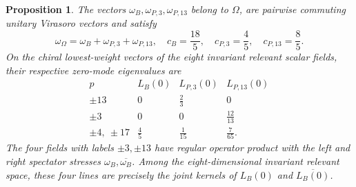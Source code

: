 \documentclass[leqno]{article}
\newtheorem{prop}[thm]{Proposition}
\numberwithin{equation}{section}
\begin{document}
\begin{prop}
\label{prop:invariant-fields-spectator-stress}
The vectors $\omega_B,\omega_{P,3},\omega_{P,13}$ belong to $\Omega$, are pairwise commuting unitary Virasoro vectors and satisfy
\[
\omega_\Omega = \omega_B+\omega_{P,3}+\omega_{P,13},\quad
c_B = \frac{18}{5},\quad c_{P,3} = \frac45,\quad c_{P,13} = \frac85.
\]
On the chiral lowest-weight vectors of the eight invariant relevant scalar fields, their respective zero-mode eigenvalues are
\begingroup
\renewcommand{\arraystretch}{1.55}
\[
\begin{array}{c|c|c|c}
p&L_B(0)&L_{P,3}(0)&L_{P,13}(0)\\
\hline
\pm13&0&\frac23&0\\
\pm3&0&0&\frac{12}{13}\\
\pm4,\ \pm17&\frac45&\frac1{15}&\frac7{65}.
\end{array}
\]
\endgroup
The four fields with labels $\pm3,\pm13$ have regular operator product with the left and right spectator stresses $\omega_B,\overline{\omega_B}$. Among the eight-dimensional invariant relevant space, these four lines are precisely the joint kernels of $L_B(0)$ and $\overline{L_B(0)}$.
\end{prop}
\end{document}

